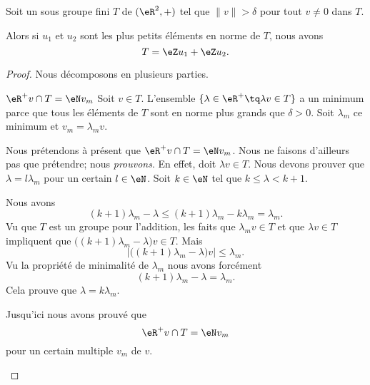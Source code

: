 \begin{lemma}       \label{LEMooDGSJooCiBhZz}
    Soit un sous groupe fini \( T\) de \( (\eR^2,+)\) tel que \( \| v \|>\delta \) pour tout \( v\neq 0\) dans \( T\).

    Alors si \( u_1\) et $u_2$ sont les plus petits éléments en norme de \( T\), nous avons
    \begin{equation}
        T=\eZ u_1+\eZ u_2.
    \end{equation}
\end{lemma}

\begin{proof}
    Nous décomposons en plusieurs parties.

    \begin{subproof}
        \item[\( \eR^+v\cap T=\eN v_m\)]
            Soit \( v\in T\). L'ensemble \( \{ \lambda \in \eR^+\tq \lambda v\in T\}\) a un minimum parce que tous les éléments de \( T\) sont en norme plus grands que \( \delta>0\). Soit \( \lambda_m\) ce minimum et \( v_m=\lambda_mv\).

            Nous prétendons à présent que \( \eR^+v\cap T=\eN v_m\). Nous ne faisons d'ailleurs pas que prétendre; nous \emph{prouvons}. En effet, doit \( \lambda v\in T\). Nous devons prouver que \( \lambda = l\lambda_m\) pour un certain \( l\in \eN\). Soit \( k\in \eN\) tel que \( k\leq \lambda<k+1\).

            Nous avons
            \begin{equation}
                (k+1)\lambda_m-\lambda\leq (k+1)\lambda_m-k\lambda_m=\lambda_m.
            \end{equation}
            Vu que \( T\) est un groupe pour l'addition, les faits que \( \lambda_mv\in T\) et que \( \lambda v\in T\) impliquent que \( \big( (k+1)\lambda_m-\lambda \big)v\in T\). Mais
            \begin{equation}
                | \big( (k+1)\lambda_m-\lambda \big)v |\leq \lambda_m.
            \end{equation}
            Vu la propriété de minimalité de \( \lambda_m\) nous avons forcément
            \begin{equation}
                (k+1)\lambda_m-\lambda = \lambda_m.
            \end{equation}
            Cela prouve que \( \lambda=k\lambda_m\). 
            
            Jusqu'ici nous avons prouvé que
            \begin{equation}
                \eR^+v\cap T=\eN v_m
            \end{equation}
            pour un certain multiple \( v_m\) de \( v\).


\end{subproof}
\end{proof}
